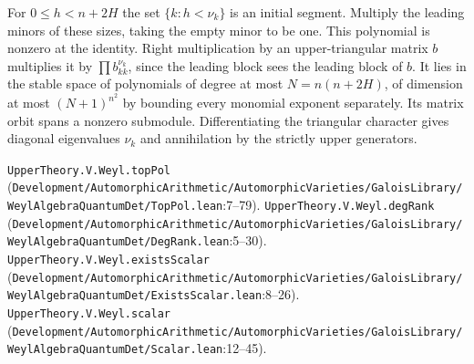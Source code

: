 For $0\le h<n+2H$ the set $\{k:h<\nu_k\}$ is an initial segment. Multiply the leading minors of these sizes, taking the empty minor to be one. This polynomial is nonzero at the identity. Right multiplication by an upper-triangular matrix $b$ multiplies it by $\prod b_{kk}^{\nu_k}$, since the leading block sees the leading block of $b$. It lies in the stable space of polynomials of degree at most $N=n(n+2H)$, of dimension at most $(N+1)^{n^2}$ by bounding every monomial exponent separately. Its matrix orbit spans a nonzero submodule. Differentiating the triangular character gives diagonal eigenvalues $\nu_k$ and annihilation by the strictly upper generators.
\par{\footnotesize \nolinkurl{UpperTheory.V.Weyl.topPol} (\nolinkurl{Development/AutomorphicArithmetic/AutomorphicVarieties/GaloisLibrary/WeylAlgebraQuantumDet/TopPol.lean}\allowbreak:7--79). \nolinkurl{UpperTheory.V.Weyl.degRank} (\nolinkurl{Development/AutomorphicArithmetic/AutomorphicVarieties/GaloisLibrary/WeylAlgebraQuantumDet/DegRank.lean}\allowbreak:5--30). \nolinkurl{UpperTheory.V.Weyl.existsScalar} (\nolinkurl{Development/AutomorphicArithmetic/AutomorphicVarieties/GaloisLibrary/WeylAlgebraQuantumDet/ExistsScalar.lean}\allowbreak:8--26). \nolinkurl{UpperTheory.V.Weyl.scalar} (\nolinkurl{Development/AutomorphicArithmetic/AutomorphicVarieties/GaloisLibrary/WeylAlgebraQuantumDet/Scalar.lean}\allowbreak:12--45).\par}


